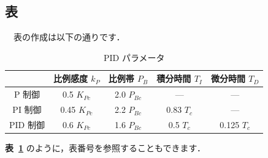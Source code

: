 \subsection{表}
　表の作成は以下の通りです．
\begin{table}[H]
\centering
\caption{PID パラメータ}
\label{table:table01}
\begin{tabular}{|c|c|c|c|c|}
	\hline
	　 &
	比例感度 \({k}_{P}\) &
	比例帯 \({P}_{B}\) &	
	積分時間 \({T}_{I}\) &
	微分時間 \({T}_{D}\) \\ \hline
	P 制御 &
	0.5 \({K}_{Pc}\) &
	2.0 \({P}_{Bc}\) &
	--- &
	--- \\ \hline
	PI 制御 &
	0.45 \({K}_{Pc}\) &
	2.2 \({P}_{Bc}\) &
	0.83 \({T}_{c}\) &
	--- \\ \hline
	PID 制御 &
	0.6 \({K}_{Pc}\) &
	1.6 \({P}_{Bc}\) &
	0.5 \({T}_{c}\) &
	0.125 \({T}_{c}\) \\ \hline
\end{tabular}
\end{table}

\textbf{表~\ref{table:table01}} のように，表番号を参照することもできます．